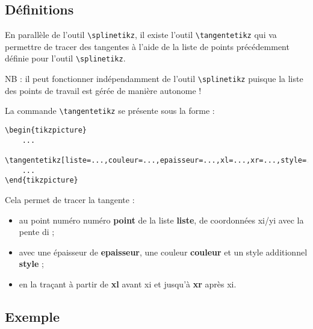\documentclass{article}
\newcommand\Cle[1]{{\bfseries\sffamily\textlangle #1\textrangle}}
\begin{document}
\subsection{Définitions}

En parallèle de l'outil \verb|\splinetikz|, il existe l'outil \verb|\tangentetikz| qui va permettre de tracer des tangentes à l'aide de la liste de points précédemment définie pour l'outil \verb|\splinetikz|.

\smallskip

NB : il peut fonctionner indépendamment de l'outil \verb|\splinetikz| puisque la liste des points de travail est gérée de manière autonome !

\medskip

La commande \verb|\tangentetikz| se présente sous la forme :

\begin{verbatim}
\begin{tikzpicture}
	...
	\tangentetikz[liste=...,couleur=...,epaisseur=...,xl=...,xr=...,style=...,point=...]
	...
\end{tikzpicture}
\end{verbatim}

Cela permet de tracer la tangente :
%
\begin{itemize}
	\item au point numéro numéro \Cle{point} de la liste \Cle{liste}, de coordonnées \textsf{xi/yi} avec la pente \textsf{di} ;
	\item avec une épaisseur de \Cle{epaisseur}, une couleur \Cle{couleur} et un style additionnel \Cle{style} ;
	\item en la traçant à partir de \Cle{xl} avant \textsf{xi} et jusqu'à \Cle{xr} après \textsf{xi}.
\end{itemize}

\subsection{Exemple}
\end{document}
